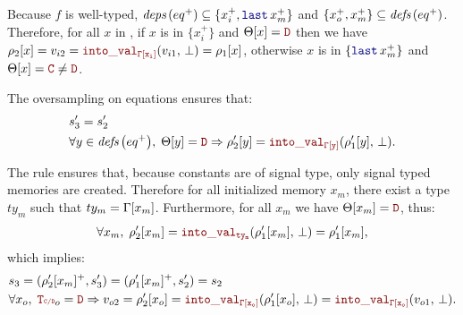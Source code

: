 \begin{skippableproof}
    Because $f$ is well-typed, $\deps{eq^+} \subseteq \{x_i^+, \last{x_m}^+\}$ and $\{x_o^+, x_m^+\}
        \subseteq {\ensuremath{\textit{defs}\left(eq^+\right)}}$.
    Therefore, for all $x$ in , if $x$ is in $\{x_i^+\}$ and $\Theta[x] = \dType$
    then we have $\rho_2[x] = v_{i2} = \intoVal{\tyCtx[x_i]}{v_{i1}}{\bot} = \rho_1[x]$,
    otherwise $x$ is in $\{\last{x_m}^+\}$ and $\Theta[x] = \cType \neq \dType$.

    The oversampling  on equations ensures that:
    \begin{align*}
         & s'_3 = s'_2                                                                                                      \\
         & \forall y \in \defs{eq^+}, \; \Theta[y] = \dType \Rightarrow \rho'_2[y] = \intoVal{\tyCtx[y]}{\rho'_1[y]}{\bot}.
    \end{align*}

    The rule  ensures that, because constants are of signal type,
    only signal typed memories are created.
    Therefore for all initialized memory $x_m$, there exist a type $ty_m$ such that $ty_m =
        \Gamma[x_m]$. Furthermore, for all $x_m$ we have $\Theta[x_m] = \dType$, thus:
    \begin{equation*}
        \forall x_m, \; \rho'_2[x_m] = \intoVal{ty_m}{\rho'_1[x_m]}{\bot} = \rho'_1[x_m],
    \end{equation*}
    which implies:
    \begin{align*}
         & s_3 = (\rho'_2[x_m]^+, s'_3) = (\rho'_1[x_m]^+, s'_2) = s_2                                                                                            \\
         & \forall x_o, \; \rType_o = \dType \Rightarrow v_{o2} = \rho'_2[x_o] = \intoVal{\tyCtx[x_o]}{\rho'_1[x_o]}{\bot} = \intoVal{\tyCtx[x_o]}{v_{o1}}{\bot}.
    \end{align*}
\end{skippableproof}

